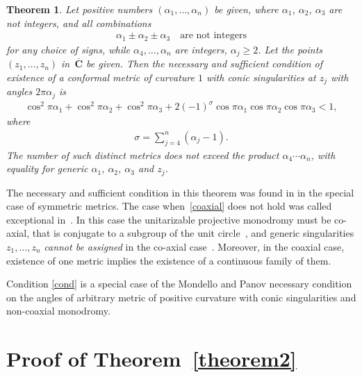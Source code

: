 \documentclass[pdftex]{sigma}
\numberwithin{equation}{section}
\newtheorem{thm}{Theorem}[section]
\def\bC{\mathbf{\overline{C}}}
\def\lc{,\allowbreak\ldots,\allowbreak}
\begin{document}
\begin{thm}\label{theorem3} Let positive numbers $(\alpha_1\lc\alpha_n)$ be given, where $\alpha_1$, $\alpha_2$, $\alpha_3$ are not integers, and all combinations
\begin{gather}\label{coaxial}
\alpha_1\pm\alpha_2\pm\alpha_3\quad\mbox{are not integers}
\end{gather}
for any choice of signs, while $\alpha_4\lc\alpha_n$ are integers, $\alpha_j\geq 2$. Let the points $(z_1\lc z_n)$ in~$\bC$ be given. Then the necessary and sufficient condition of existence of a conformal metric of curvature $1$ with conic singularities at $z_j$ with angles $2\pi\alpha_j$ is
\begin{gather}\label{cond}
\cos^2 \pi\alpha_1+\cos^2 \pi\alpha_2+\cos^2 \pi\alpha_3+2(-1)^\sigma \cos\pi\alpha_1 \cos\pi\alpha_2 \cos\pi\alpha_3 < 1,
\end{gather}
where
\begin{gather*}
\sigma =\sum_{j=4}^n(\alpha_j-1).
\end{gather*}
The number of such distinct metrics does not exceed the product $\alpha_4\cdots\alpha_n$, with equality for generic $\alpha_1$, $\alpha_2$, $\alpha_3$ and $z_j$.
\end{thm}

The necessary and sufficient condition in this theorem was found in \cite{EGT} in the special case of symmetric metrics. The case when~\eqref{coaxial} does not hold was called exceptional in~\cite{EGT}. In this case the unitarizable projective monodromy must be co-axial, that is conjugate to a subgroup of the unit circle~\cite{MP}, and generic singularities $z_1,\ldots,z_n$ {\em cannot be assigned} in the co-axial case~\cite{E2}. Moreover, in the coaxial case, existence of one metric implies the existence of a continuous family of them.

Condition \eqref{cond} is a special case of the Mondello and Panov necessary condition on the angles of arbitrary metric of positive curvature with conic singularities and non-coaxial monodromy.

\section{Proof of Theorem~\ref{theorem2}}\label{section3}
\end{document}
